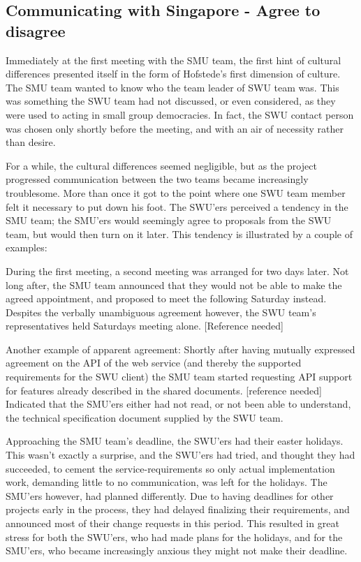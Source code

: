 \subsection{Communicating with Singapore - Agree to disagree}
\label{sec:communicating}

Immediately at the first meeting with the SMU team, the first hint of cultural
differences presented itself in the form of Hofstede's first dimension of
culture\cite{surprises}. The SMU team wanted to know who the team leader of SWU
team was. This was something the SWU team had not discussed, or even
considered, as they were used to acting in small group democracies.
In fact, the SWU contact person was chosen only shortly before the meeting,
and with an air of necessity rather than desire.

For a while, the cultural differences seemed negligible, but as the project
progressed communication between the two teams became increasingly troublesome.
More than once it got to the point where one SWU team member felt it necessary
to put down his foot\cite{enough}. The SWU'ers perceived a tendency in the SMU
team; the SMU'ers would seemingly agree to proposals from the SWU team, but
would then turn on it later. This tendency is illustrated by a couple of
examples:

During the first meeting, a second meeting was arranged for two days later. Not
long after, the SMU team announced that they would not be able to make the
agreed appointment, and proposed to meet the following Saturday instead.
Despites the verbally unambiguous agreement however, the SWU team's
representatives held Saturdays meeting alone. [Reference needed]

Another example of apparent agreement: Shortly after having mutually expressed
agreement on the API of the web service (and thereby the supported requirements
for the SWU client) the SMU team started requesting API support for features
already described in the shared documents. [reference needed] Indicated that
the SMU'ers either had not read, or not been able to understand, the technical
specification document supplied by the SWU team.

Approaching the SMU team's deadline, the SWU'ers had their easter holidays.
This wasn't exactly a surprise, and the SWU'ers had tried, and thought they had
succeeded, to cement the service-requirements so only actual implementation
work, demanding little to no communication, was left for the holidays. The
SMU'ers however, had planned differently. Due to having deadlines for other
projects early in the process, they had delayed finalizing their requirements,
and announced most of their change requests in this period. This resulted in
great stress for both the SWU'ers, who had made plans for the holidays, and for
the SMU'ers, who became increasingly anxious they might not make their deadline.

